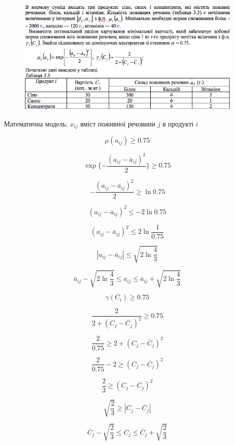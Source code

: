 \begin{center}
  \normalsize{}
\end{center}

\begin{figure}[h!]
  \centering
  \includegraphics[width=14.1cm]{3_3.png}
  \centering
\end{figure}

Математична модель: $x_{ij}$ вміст поживної речовини  $j$ в продукті $i$

\begin{multicols}{2}
  $$\mu(a_{ij}) \geqslant 0.75  $$

  $$ \exp\{ - \dfrac{(a_{ij}-\overline{a}_{ij})^2}{2} \} \geqslant 0.75 $$

  $$- \dfrac{(a_{ij}-\overline{a}_{ij})^2}{2} \geqslant \ln{0.75} $$

  $$ (a_{ij}-\overline{a}_{ij})^2 \leqslant -2 \ln{0.75} $$

  $$ (a_{ij}-\overline{a}_{ij})^2 \leqslant 2 \ln{\dfrac{1}{0.75}} $$


  $$|a_{ij}-\overline{a}_{ij}| \leqslant \sqrt{2\ln{\dfrac{4}{3}}} $$

  $$ \overline{a}_{ij} - \sqrt{2 \ln{\dfrac{4}{3}}} \leqslant a_{ij} \leqslant \overline{a}_{ij} + \sqrt{ 2 \ln{\dfrac{4}{3}}}$$

  \columnbreak
  $$\gamma(C_{i}) \geqslant 0.75 $$

  $$
  \dfrac{2}{2+(C_{j}-\overline{C}_{j})^2} \geqslant 0.75
  $$

  $$
  \dfrac{2}{0.75} \geqslant 2+(C_{j}-\overline{C}_{j})^2
  $$

  $$
  \dfrac{2}{0.75} - 2 \geqslant (C_{j}-\overline{C}_{j})^2
  $$

  $$
  \dfrac{2}{3} \geqslant (C_{j}-\overline{C}_{j})^2
  $$

  $$
  \sqrt{\dfrac{2}{3}} \geqslant |C_{j}-\overline{C}_{j}|
  $$

  $$
  \overline{C}_{j} - \sqrt{\dfrac{2}{3}} \leqslant C_{j} \leqslant \overline{C}_{j} + \sqrt{\dfrac{2}{3}}
  $$

\end{multicols}



